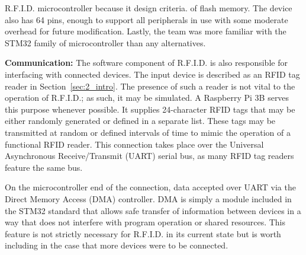  \DIFaddend R.F.I.D. \DIFdelbegin {}\DIFdelend \DIFaddbegin {}\DIFaddend microcontroller because it \DIFdelbegin {}\DIFdelend \DIFaddbegin {}\DIFaddend design criteria. \DIFdelbegin {}\DIFdelend \DIFaddbegin {}\DIFaddend of flash memory\DIFdelbegin {}\DIFdelend . The device also has 64 pins, enough to support all peripherals in use with some moderate overhead for future modification. Lastly, the team was more familiar with the STM32 family of microcontroller than any alternatives.

\textbf{Communication:} The software component of R.F.I.D. is also responsible for interfacing with connected devices. The input device is described as an RFID tag reader in Section~\ref{sec:2_intro}. The presence of such a reader is not vital to the operation of R.F.I.D.; as such, it may be simulated. A Raspberry Pi 3B serves this purpose whenever possible. It supplies 24-character RFID tags that may be either randomly generated or defined in a separate list. These tags may be transmitted at random or defined intervals of time to mimic the operation of a functional RFID reader. This connection takes place over the Universal Asynchronous Receive/Transmit (UART) serial bus, as many RFID tag readers feature the same bus.

On the microcontroller end of the connection, data \DIFdelbegin {}\DIFdelend \DIFaddbegin {}\DIFaddend accepted over UART via the Direct Memory Access (DMA) controller. DMA is simply a module included in the STM32 standard that allows safe transfer of information between devices in a way that does not interfere with program operation or shared resources. This feature is not strictly necessary for R.F.I.D. in its current state \DIFdelbegin \DIFdel{, }\DIFdelend but is worth including in the case that more devices were to be connected. 

